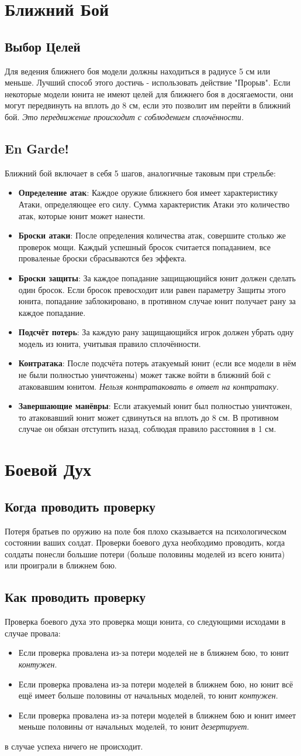 \documentclass[twocolumn]{article}
\newcommand{\h}[1]{\textbf{#1}}
\newcommand{\ssec}[1]{\section{#1}\label{sec:#1}}
\newcommand{\subsec}[1]{\subsection{#1}\label{subsec:#1}}
\begin{document}
\newpage

\ssec{Ближний Бой}
\subsec{Выбор Целей}
Для ведения ближнего боя модели должны находиться в радиусе 5 см или меньше. Лучший способ этого достичь - использовать действие "Прорыв". Если некоторые модели юнита не имеют целей для ближнего боя в досягаемости, они могут передвинуть на вплоть до 8 см, если это позволит им перейти в ближний бой. \emph{Это передвижение происходит с соблюдением сплочённости.}

\subsec{En Garde!}
Ближний бой включает в себя 5 шагов, аналогичные таковым при стрельбе:
\begin{itemize}
    \item \h{Определение атак}: Каждое оружие ближнего боя имеет характеристику Атаки, определяющее его силу. Сумма характеристик Атаки это количество атак, которые юнит может нанести.
    \item \h{Броски атаки}: После определения количества атак, совершите столько же проверок мощи. Каждый успешный бросок считается попаданием, все проваленые броски сбрасываются без эффекта.
    \item \h{Броски защиты}: За каждое попадание защищающийся юнит должен сделать один бросок. Если бросок превосходит или равен параметру Защиты этого юнита, попадание заблокировано, в противном случае юнит получает рану за каждое попадание.
    \item \h{Подсчёт потерь}: За каждую рану защищающийся игрок должен убрать одну модель из юнита, учитывая правило сплочённости.
    \item \h{Контратака}: После подсчёта потерь атакуемый юнит (если все модели в нём не были полностью уничтожены) может также войти в ближний бой с атаковавшим юнитом. \emph{Нельзя контратаковать в ответ на контратаку.}
    \item \h{Завершающие манёвры}: Если атакуемый юнит был полностью уничтожен, то атаковавший юнит может сдвинуться на вплоть до 8 см. В противном случае он обязан отступить назад, соблюдая правило расстояния в 1 см.
\end{itemize}

\newpage

\ssec{Боевой Дух}
\subsec{Когда проводить проверку}
Потеря братьев по оружию на поле боя плохо сказывается на психологическом состоянии ваших солдат. Проверки боевого духа необходимо проводить, когда солдаты понесли большие потери (больше половины моделей из всего юнита) или проиграли в ближнем бою.

\subsec{Как проводить проверку}
Проверка боевого духа это проверка мощи юнита, со следующими исходами в случае провала:
\begin{itemize}
    \item Если проверка провалена из-за потери моделей не в ближнем бою, то юнит \emph{контужен}.
    \item Если проверка провалена из-за потери моделей в ближнем бою, но юнит всё ещё имеет больше половины от начальных моделей, то юнит \emph{контужен}.
    \item Если проверка провалена из-за потери моделей в ближнем бою и юнит имеет меньше половины от начальных моделей, то юнит \emph{дезертирует}.
\end{itemize}
в случае успеха ничего не происходит.
\end{document}

